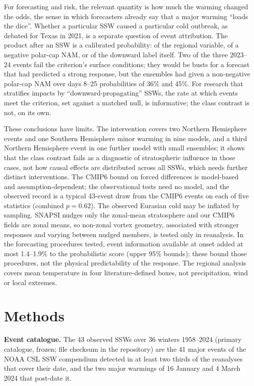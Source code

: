 \documentclass[11pt]{article}
\begin{document}
For forecasting and risk, the relevant quantity is how much the warming changed the odds, the sense in which forecasters already say that a major warming ``loads the dice''\cite{butler24}. Whether a particular SSW caused a particular cold outbreak, as debated for Texas in 2021\cite{cohen21,davis22}, is a separate question of event attribution. The product after an SSW is a calibrated probability: of the regional variable, of a negative polar-cap NAM, or of the downward label itself. Two of the three 2023--24 events fail the criterion's surface conditions; they would be busts for a forecast that had predicted a strong response\cite{nebel24}, but the ensembles had given a non-negative polar-cap NAM over days 8--25 probabilities of 36\% and 45\%. For research that stratifies impacts by ``downward-propagating'' SSWs, the rate at which events meet the criterion, set against a matched null, is informative; the class contrast is not, on its own.

These conclusions have limits. The intervention covers two Northern Hemisphere events and one Southern Hemisphere minor warming in nine models, and a third Northern Hemisphere event in one further model with small ensembles; it shows that the class contrast fails as a diagnostic of stratospheric influence in those cases, not how causal effects are distributed across all SSWs, which needs further distinct interventions. The CMIP6 bound on forced differences is model-based and assumption-dependent; the observational tests need no model, and the observed record is a typical 43-event draw from the CMIP6 events on each of five statistics (combined $p = 0.62$). The observed Eurasian cold may be inflated by sampling\cite{kolstad22}. SNAPSI nudges only the zonal-mean stratosphere and our CMIP6 fields are zonal means, so non-zonal vortex geometry, associated with stronger responses\cite{nebel24} and varying between nudged members\cite{feng25}, is tested only in reanalysis. In the forecasting procedures tested, event information available at onset added at most 1.4--1.9\% to the probabilistic score (upper 95\% bounds); these bound those procedures, not the physical predictability of the response. The regional analysis covers mean temperature in four literature-defined boxes, not precipitation, wind or local extremes.

\section*{Methods}

\textbf{Event catalogue.} The 43 observed SSWs over 36 winters 1958–2024 (primary catalogue, frozen; file checksum in the repository) are the 41 major events of the NOAA CSL SSW compendium\cite{butler17} detected in at least two thirds of the reanalyses that cover their date, and the two major warmings of 16 January and 4 March 2024 that post-date it\cite{leeSH25}.
\end{document}
